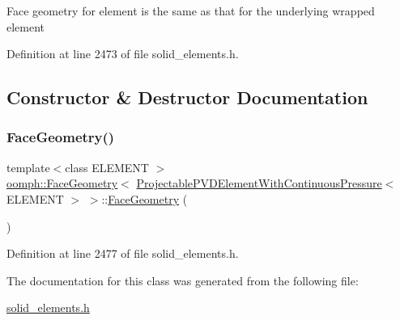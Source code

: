 Face geometry for element is the same as that for the underlying wrapped element 

Definition at line 2473 of file solid\+\_\+elements.\+h.



\subsection{Constructor \& Destructor Documentation}
\mbox{\label{classoomph_1_1FaceGeometry_3_01ProjectablePVDElementWithContinuousPressure_3_01ELEMENT_01_4_01_4_a9f774e966a9830f7763dcc95d555084b}} 
\subsubsection{\texorpdfstring{Face\+Geometry()}{FaceGeometry()}}
{\footnotesize\ttfamily template$<$class E\+L\+E\+M\+E\+NT $>$ \\
\hyperlink{classoomph_1_1FaceGeometry}{oomph\+::\+Face\+Geometry}$<$ \hyperlink{classoomph_1_1ProjectablePVDElementWithContinuousPressure}{Projectable\+P\+V\+D\+Element\+With\+Continuous\+Pressure}$<$ E\+L\+E\+M\+E\+NT $>$ $>$\+::\hyperlink{classoomph_1_1FaceGeometry}{Face\+Geometry} (\begin{DoxyParamCaption}{ }\end{DoxyParamCaption})\hspace{0.3cm}{\ttfamily [inline]}}



Definition at line 2477 of file solid\+\_\+elements.\+h.



The documentation for this class was generated from the following file\+:\begin{DoxyCompactItemize}
\item 
\hyperlink{solid__elements_8h}{solid\+\_\+elements.\+h}\end{DoxyCompactItemize}
